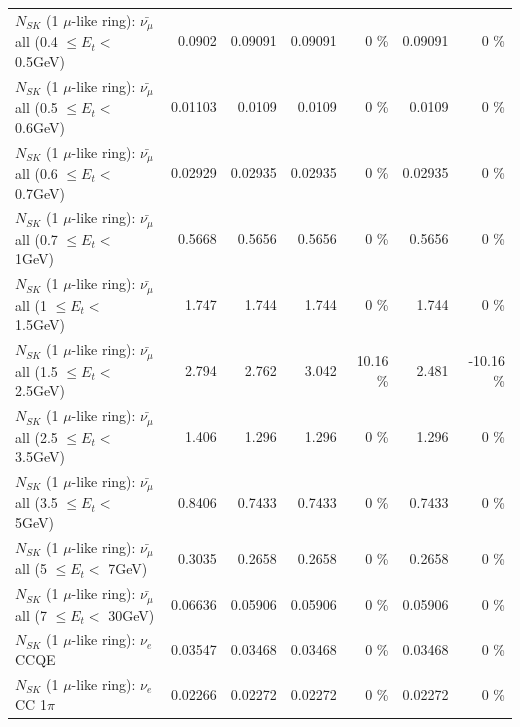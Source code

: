 \begin{table}
\begin{tabular}{| l | r | r | r  r | r  r |}
 $N_{SK}$ (1 $\mu$-like ring): $\bar{\nu_{\mu}}$ all (0.4 $\leq E_{t} <$ 0.5GeV) &          0.0902 &         0.09091 &         0.09091 &        0 \%  &         0.09091 &        0 \%  \\ 
 $N_{SK}$ (1 $\mu$-like ring): $\bar{\nu_{\mu}}$ all (0.5 $\leq E_{t} <$ 0.6GeV) &         0.01103 &          0.0109 &          0.0109 &        0 \%  &          0.0109 &        0 \%  \\ 
 $N_{SK}$ (1 $\mu$-like ring): $\bar{\nu_{\mu}}$ all (0.6 $\leq E_{t} <$ 0.7GeV) &         0.02929 &         0.02935 &         0.02935 &        0 \%  &         0.02935 &        0 \%  \\ 
   $N_{SK}$ (1 $\mu$-like ring): $\bar{\nu_{\mu}}$ all (0.7 $\leq E_{t} <$ 1GeV) &          0.5668 &          0.5656 &          0.5656 &        0 \%  &          0.5656 &        0 \%  \\ 
   $N_{SK}$ (1 $\mu$-like ring): $\bar{\nu_{\mu}}$ all (1 $\leq E_{t} <$ 1.5GeV) &           1.747 &           1.744 &           1.744 &        0 \%  &           1.744 &        0 \%  \\ 
 $N_{SK}$ (1 $\mu$-like ring): $\bar{\nu_{\mu}}$ all (1.5 $\leq E_{t} <$ 2.5GeV) &           2.794 &           2.762 &           3.042 &    10.16 \%  &           2.481 &   -10.16 \%  \\ 
 $N_{SK}$ (1 $\mu$-like ring): $\bar{\nu_{\mu}}$ all (2.5 $\leq E_{t} <$ 3.5GeV) &           1.406 &           1.296 &           1.296 &        0 \%  &           1.296 &        0 \%  \\ 
   $N_{SK}$ (1 $\mu$-like ring): $\bar{\nu_{\mu}}$ all (3.5 $\leq E_{t} <$ 5GeV) &          0.8406 &          0.7433 &          0.7433 &        0 \%  &          0.7433 &        0 \%  \\ 
     $N_{SK}$ (1 $\mu$-like ring): $\bar{\nu_{\mu}}$ all (5 $\leq E_{t} <$ 7GeV) &          0.3035 &          0.2658 &          0.2658 &        0 \%  &          0.2658 &        0 \%  \\ 
    $N_{SK}$ (1 $\mu$-like ring): $\bar{\nu_{\mu}}$ all (7 $\leq E_{t} <$ 30GeV) &         0.06636 &         0.05906 &         0.05906 &        0 \%  &         0.05906 &        0 \%  \\ 
\hline
\hline
\hline
                                      $N_{SK}$ (1 $\mu$-like ring): $\nu_e$ CCQE &         0.03547 &         0.03468 &         0.03468 &        0 \%  &         0.03468 &        0 \%  \\ 
                                 $N_{SK}$ (1 $\mu$-like ring): $\nu_e$ CC 1$\pi$ &         0.02266 &         0.02272 &         0.02272 &        0 \%  &         0.02272 &        0 \%  \\ 

\end{tabular}
\end{table}
